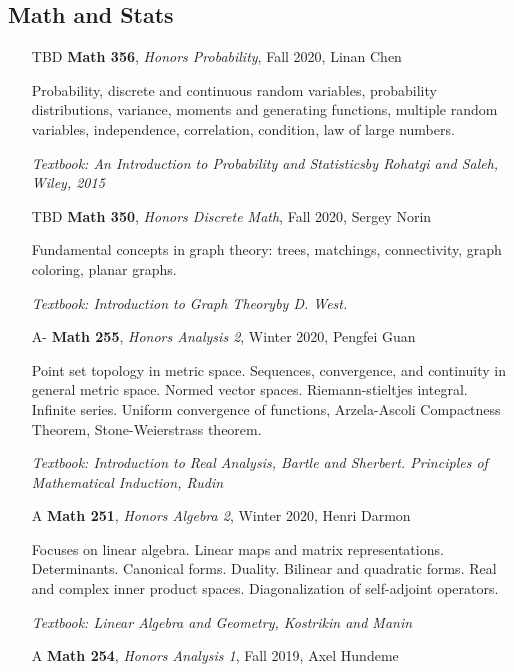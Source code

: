 \documentclass{scrartcl}
\begin{document}
\subsection*{Math and Stats}

\begin{itemize}
  \item[TBD] \textbf{Math 356}, \textit{Honors Probability}, Fall 2020, Linan Chen
  
    Probability, discrete and continuous random variables, probability distributions, variance, moments and generating functions, multiple random variables, independence, correlation, condition, law of large numbers.
    
    \textit{\small Textbook: An Introduction to Probability and Statisticsby Rohatgi and Saleh, Wiley, 2015}

  \item[TBD] \textbf{Math 350}, \textit{Honors Discrete Math}, Fall 2020, Sergey Norin
  
    Fundamental concepts in graph theory: trees, matchings, connectivity, graph coloring, planar graphs. 
    
    \textit{\small Textbook: Introduction to Graph Theoryby D. West.}

  \item[A-] \textbf{Math 255}, \textit{Honors Analysis 2}, Winter 2020, Pengfei
    Guan

    Point set topology in metric space. Sequences, convergence, and continuity
    in general metric space. Normed vector spaces. Riemann-stieltjes integral.
    Infinite series. Uniform convergence of functions, Arzela-Ascoli Compactness
    Theorem, Stone-Weierstrass theorem.
    
    \textit{\small Textbook: Introduction to Real Analysis, Bartle and Sherbert.
    Principles of Mathematical Induction, Rudin}

  \item[A] \textbf{Math 251}, \textit{Honors Algebra 2}, Winter 2020, Henri Darmon

    Focuses on linear algebra. Linear maps and matrix representations.
    Determinants. Canonical forms. Duality. Bilinear and quadratic forms. Real
    and complex inner product spaces. Diagonalization of self-adjoint operators.

    \textit{\small Textbook: Linear Algebra and Geometry, Kostrikin and Manin}

  \item[A] \textbf{Math 254}, \textit{Honors Analysis 1}, Fall 2019,  Axel Hundeme 
  

\end{itemize}
\end{document}
